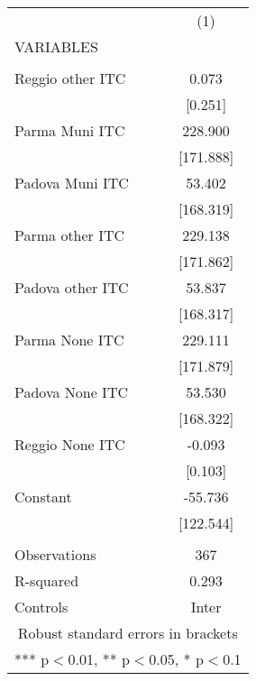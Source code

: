 \begin{tabular}{lc} \hline
 & (1) \\
VARIABLES &  \\ \hline
 &  \\
Reggio other ITC & 0.073 \\
 & [0.251] \\
Parma Muni ITC & 228.900 \\
 & [171.888] \\
Padova Muni ITC & 53.402 \\
 & [168.319] \\
Parma other ITC & 229.138 \\
 & [171.862] \\
Padova other ITC & 53.837 \\
 & [168.317] \\
Parma None ITC & 229.111 \\
 & [171.879] \\
Padova None ITC & 53.530 \\
 & [168.322] \\
Reggio None ITC & -0.093 \\
 & [0.103] \\
Constant & -55.736 \\
 & [122.544] \\
 &  \\
Observations & 367 \\
R-squared & 0.293 \\
 Controls & Inter \\ \hline
\multicolumn{2}{c}{ Robust standard errors in brackets} \\
\multicolumn{2}{c}{ *** p$<$0.01, ** p$<$0.05, * p$<$0.1} \\
\end{tabular}
